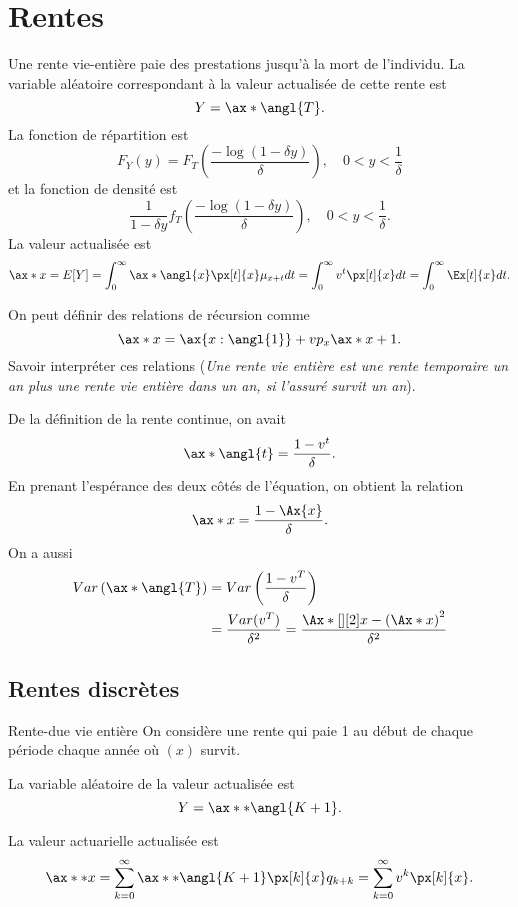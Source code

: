 \chapter{Rentes}

\begin{definition}{}{}
	Une rente vie-entière paie des prestations jusqu'à la mort de l'individu. La variable aléatoire correspondant à la valeur actualisée de cette rente est 
	$$Y = \ax*{\angl{T}}.$$
	La fonction de répartition est 
	$$F_Y(y) = F_T\left(\frac{-\log(1-\delta y)}{\delta}\right), \quad 0<y< \frac{1}{\delta}$$
	et la fonction de densité est
	$$\frac{1}{1- \delta y} f_T\left(\frac{-\log(1-\delta y)}{\delta}\right), \quad 0<y< \frac{1}{\delta}.$$
	La valeur actualisée est 
	$$\ax*{x} = E[Y] = \int_{0}^{\infty} \ax*{\angl{x}} \px[t]{x}\mu_{x + t} dt = \int_{0}^{\infty} v^t \px[t]{x} dt = \int_{0}^{\infty} \Ex[t]{x}dt.$$
\end{definition}

On peut définir des relations de récursion comme
$$\ax*{x} = \ax{x:\angl{1}} + vp_x \ax*{x+1}.$$ Savoir interpréter ces relations (\textit{Une rente vie entière est une rente temporaire un an plus une rente vie entière dans un an, si l'assuré survit un an}).

De la définition de la rente continue, on avait
$$\ax*{\angl{t}} = \frac{1 - v^t}{\delta}.$$
En prenant l'espérance des deux côtés de l'équation, on obtient la relation 
$$\ax*{x} = \frac{1 - \Ax{x}}{\delta}.$$
On a aussi 
\begin{align*}
Var\left(\ax*{\angl{T}}\right) &= Var \left(\frac{1 - v^T}{\delta}\right)\\
&= \frac{Var(v^T)}{\delta^2} = \frac{\Ax*[][2]{x} - \left(\Ax*{x}\right)^2}{\delta^2}
\end{align*}

\section{Rentes discrètes}

\begin{definition}{Rente-due vie entière}{}
	On considère une rente qui paie 1 au début de chaque période chaque année où $(x)$ survit. 
	
	La variable aléatoire de la valeur actualisée est $$Y = \ax**{\angl{K + 1}}.$$
	
	La valeur actuarielle actualisée est 
	$$\ax**{x} = \sum_{k = 0}^{\infty} \ax**{\angl{K + 1}} \px[k]{x}q_{k + k} = \sum_{k = 0}^{\infty} v^k \px[k]{x}.$$
\end{definition}

